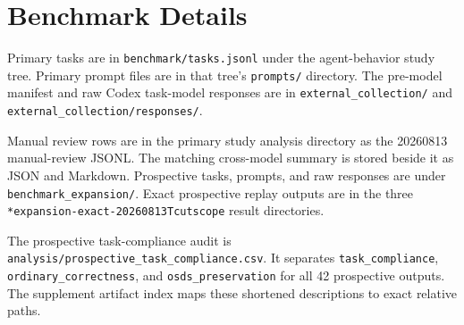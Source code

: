 ﻿\section{Benchmark Details}

Primary tasks are in \texttt{benchmark/tasks.jsonl} under the agent-behavior study tree. Primary prompt files are in that tree's \texttt{prompts/} directory. The pre-model manifest and raw Codex task-model responses are in \texttt{external\_collection/} and \texttt{external\_collection/responses/}.

Manual review rows are in the primary study analysis directory as the 20260813 manual-review JSONL. The matching cross-model summary is stored beside it as JSON and Markdown. Prospective tasks, prompts, and raw responses are under \texttt{benchmark\_expansion/}. Exact prospective replay outputs are in the three \texttt{*expansion-exact-20260813Tcutscope} result directories.

The prospective task-compliance audit is \texttt{analysis/prospective\_task\_compliance.csv}. It separates \texttt{task\_compliance}, \texttt{ordinary\_correctness}, and \texttt{osds\_preservation} for all 42 prospective outputs. The supplement artifact index maps these shortened descriptions to exact relative paths.
